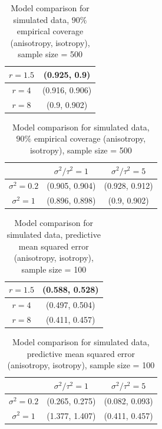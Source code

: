 \documentclass[12pt,twoside]{dukestatscithesis}
\theoremstyle{definition}
\theoremstyle{definition}
\theoremstyle{definition}
\theoremstyle{remark}
\begin{document}
\begin{table}[H]
\centering
\setlength{\extrarowheight}{10pt}
\hspace*{-1.5cm}
\begin{tabular}{|c|c|}
\hline
$r = 1.5$ & (0.925, 0.9) \\[5pt]
\hline
$r = 4$ & (0.916, 0.906) \\[5pt]
\hline
$r = 8$ & (0.9, 0.902) \\[5pt]
\hline
\end{tabular}
\quad
\begin{tabular}{|c|c|c|}
\hline
 & $\sigma^2/\tau^2 = 1 $ & $\sigma^2/\tau^2 = 5$\\[8pt]
\hline
$\sigma^2 = 0.2$ & (0.905, 0.904) & (0.928, 0.912)\\[8pt]
\hline
$\sigma^2 = 1$ & (0.896, 0.898) & (0.9, 0.902)\\[8pt]
\hline
\end{tabular}
\hspace*{-1.5cm}
\caption{Model comparison for simulated data, $90\%$ empirical coverage (anisotropy, isotropy), sample size = 500}
\end{table}
\begin{table}[H]
\centering
\setlength{\extrarowheight}{10pt}
\hspace*{-1.5cm}
\begin{tabular}{|c|c|}
\hline
$r = 1.5$ & (0.588, 0.528) \\[5pt]
\hline
$r = 4$ & (0.497, 0.504) \\[5pt]
\hline
$r = 8$ & (0.411, 0.457) \\[5pt]
\hline
\end{tabular}
\quad
\begin{tabular}{|c|c|c|}
\hline
 & $\sigma^2/\tau^2 = 1 $ & $\sigma^2/\tau^2 = 5$\\[8pt]
\hline
$\sigma^2 = 0.2$ & (0.265, 0.275) & (0.082, 0.093)\\[8pt]
\hline
$\sigma^2 = 1$ & (1.377, 1.407) & (0.411, 0.457)\\[8pt]
\hline
\end{tabular}
\hspace*{-1.5cm}
\caption{Model comparison for simulated data, predictive mean squared error (anisotropy, isotropy), sample size = 100}
\end{table}
\end{document}
